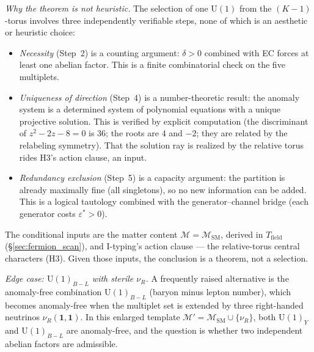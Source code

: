 \documentclass[11pt]{article}
\theoremstyle{definition}
\newcommand{\U}{\mathrm{U}}
\begin{document}
\noindent\textit{Why the theorem is not heuristic.}\quad
The selection of one $\U(1)$ from the $(K-1)$-torus involves three
independently verifiable steps, none of which is an aesthetic or
heuristic choice:
\begin{itemize}[nosep]
  \item \textit{Necessity} (Step~2) is a counting argument:
  $\delta > 0$ combined with EC forces at least one abelian factor.
  This is a finite combinatorial check on the five multiplets.
  \item \textit{Uniqueness of direction} (Step~4) is a
  number-theoretic result: the anomaly system is a determined system
  of polynomial equations with a unique projective solution.  This is
  verified by explicit computation (the discriminant of
  $z^2 - 2z - 8 = 0$ is $36$; the roots are $4$ and $-2$; they are
  related by the relabeling symmetry).  That the solution ray is
  realized by the relative torus rides H3's action clause, an input.
  \item \textit{Redundancy exclusion} (Step~5) is a capacity
  argument: the partition is already maximally fine (all singletons),
  so no new information can be added.  This is a logical tautology
  combined with the generator--channel bridge (each generator costs
  $\varepsilon^* > 0$).
\end{itemize}
The conditional inputs are the matter content
$\mathcal{M} = \mathcal{M}_{\mathrm{SM}}$, derived in
$T_{\mathrm{field}}$ (\S\ref{sec:fermion_scan}), and I-typing's
action clause --- the relative-torus central characters (H3).  Given
those inputs, the conclusion is a theorem, not a selection.


\smallskip\noindent\textit{Edge case: $\U(1)_{B-L}$ with sterile
$\nu_R$.}\quad
A frequently raised alternative is the anomaly-free combination
$\U(1)_{B-L}$ (baryon minus lepton number), which becomes anomaly-free
when the multiplet set is extended by three right-handed neutrinos
$\nu_R(\mathbf{1},\mathbf{1})$.  In this enlarged template
$\mathcal{M}' = \mathcal{M}_{\mathrm{SM}} \cup \{\nu_R\}$, both
$\U(1)_Y$ and $\U(1)_{B-L}$ are anomaly-free, and the question is
whether two independent abelian factors are admissible.
\end{document}
